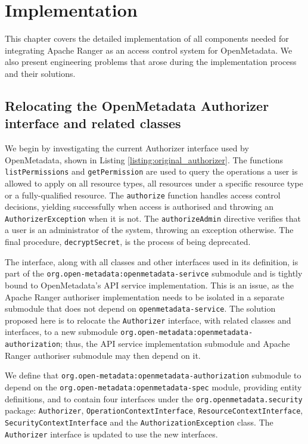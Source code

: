 \chapter{\label{cha:impl} Implementation}

This chapter covers the detailed implementation of all components needed for integrating Apache Ranger as an access control system for OpenMetadata. We also present engineering problems that arose during the implementation process and their solutions.

\section[Relocating OpenMetadata classes]{Relocating the OpenMetadata Authorizer interface and related classes}

We begin by investigating the current Authorizer interface used by OpenMetadata, shown in Listing \ref{listing:original_authorizer}. The functions \texttt{listPermissions} and \texttt{getPermission} are used to query the operations a user is allowed to apply on all resource types, all resources under a specific resource type or a fully-qualified resource. The \texttt{authorize} function handles access control decisions, yielding successfully when access is authorised and throwing an \texttt{AuthorizerException} when it is not. The \texttt{authorizeAdmin} directive verifies that a user is an administrator of the system, throwing an exception otherwise. The final procedure, \texttt{decryptSecret}, is the process of being deprecated. 

The interface, along with all classes and other interfaces used in its definition, is part of the \texttt{org.open-metadata:openmetadata-serivce} submodule and is tightly bound to OpenMetadata's API service implementation. This is an issue, as the Apache Ranger authoriser implementation needs to be isolated in a separate submodule that does not depend on \texttt{openmetadata-service}. The solution proposed here is to relocate the \texttt{Authorizer} interface, with related classes and interfaces, to a new submodule \texttt{org.open-metadata:openmetadata-authorization}; thus, the API service implementation submodule and Apache Ranger authoriser submodule may then depend on it.

We define that \texttt{org.open-metadata:openmetadata-authorization} submodule to depend on the \texttt{org.open-metadata:openmetadata-spec} module, providing entity definitions, and to contain four interfaces under the \texttt{org.openmetadata.security} package: \texttt{Authorizer}, \texttt{OperationContextInterface}, \texttt{ResourceContextInterface}, \texttt{SecurityContextInterface} and the \texttt{AuthorizationException} class. The \texttt{Authorizer} interface is updated to use the new interfaces.

